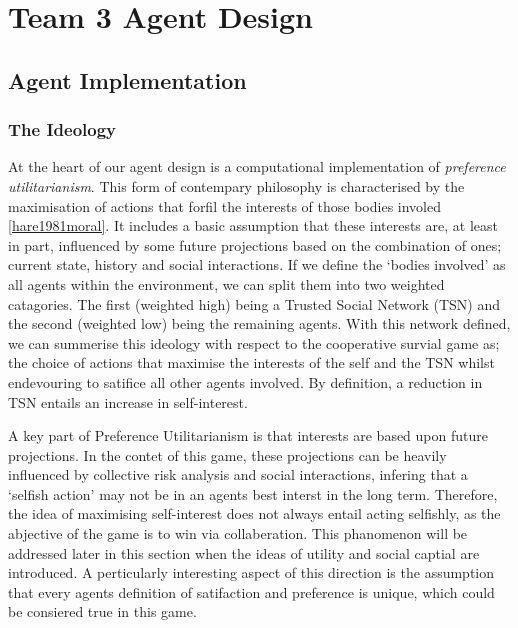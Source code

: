 \chapter{Team 3 Agent Design}\label{team_3_agent_design}

\section{Agent Implementation}
    
    \subsection{The Ideology}

        At the heart of our agent design is a computational implementation of \textit{preference utilitarianism}. This form of contempary philosophy is characterised by the maximisation of actions that forfil the interests of those bodies involed \ref{hare1981moral}. It includes a basic assumption that these interests are, at least in part, influenced by some future projections based on the combination of ones; current state, history and social interactions. If we define the `bodies involved' as all agents within the environment, we can split them into two weighted catagories. The first (weighted high) being a Trusted Social Network (TSN) and the second (weighted low) being the remaining agents. With this network defined, we can summerise this ideology with respect to the cooperative survial game as; the choice of actions that maximise the interests of the self and the TSN whilst endevouring to satifice all other agents involved. By definition, a reduction in TSN entails an increase in self-interest. 
        
        A key part of Preference Utilitarianism is that interests are based upon future projections. In the contet of this game, these projections can be heavily influenced by collective risk analysis and social interactions, infering that a `selfish action' may not be in an agents best interst in the long term. Therefore, the idea of maximising self-interest does not always entail acting selfishly, as the abjective of the game is to win via collaberation. This phanomenon will be addressed later in this section when the ideas of utility and social captial are introduced. A perticularly interesting aspect of this direction is the assumption that every agents definition of satifaction and preference is unique, which could be consiered true in this game.  
        
